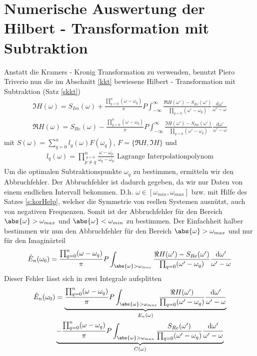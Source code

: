 \section{Numerische Auswertung der Hilbert - Transformation mit Subtraktion}\label{num:skkt}
Anstatt die Kramers - Kronig Transformation zu verwenden, benutzt Piero Triverio \cite{Triverio2006a} nun die im Abschnitt \ref{kkt} bewiesene Hilbert - Transformation mit Subtraktion (Satz \ref{skkt}) 
\begin{align}
	\Im{H(\omega)} = S_{Im}(\omega) + \frac{\prod_{q=0}^{n} (\omega - \omega_q)}{\pi} P \int_{-\infty}^{\infty} \frac{\Re{H(\omega')} - S_{Re}(\omega')}{\prod_{q = 0} (\omega' - \omega_q)} \frac{\mathrm{d\omega'}}{\omega' -\omega}\label{skkt:gl1} \\
\Re{H(\omega)} = S_{Re}(\omega) - \frac{\prod_{q=0}^{n} (\omega - \omega_q)}{\pi} P \int_{-\infty}^{\infty} \frac{\Im{H(\omega')} - S_{Im}(\omega')}{\prod_{q = 0} (\omega' - \omega_q)} \frac{\mathrm{d\omega'}}{\omega' -\omega} \label{skkt:gl2}
\end{align}
mit $S(\omega) = \sum_{q=0}^{n} l_q(\omega) F(\omega_q)$, $F =\{\Re{H}, \Im{H}\} $ und 
\begin{align}
	l_q(\omega) = \prod_{\stackrel{p=0 }{p \neq q}}^n \frac{\omega - \omega_p}{\omega_q - \omega_p} \text{ Lagrange Interpolationpolynom}
\end{align}
Um die optimalen Subtraktionspunkte $\omega_q$ zu bestimmen, ermitteln wir den Abbruchfehler. Der Abbruchfehler ist dadurch gegeben, da wir nur Daten von einem endlichen Intervall bekommen. D.h. $\omega \in [\omega_{min}, \omega_{max}]$ 
bzw. mit Hilfe des Satzes \ref{s:korHelp}, welcher die Symmetrie von reellen Systemen ausnützt, auch von negativen Frequenzen. Somit ist der Abbruchfehler für den Bereich $\abs{\omega} > \omega_{max}$ und $\abs{\omega} < \omega_{min}$ zu bestimmen. Der Einfachheit halber bestimmen wir nun den Abbruchfehler für den Bereich $\abs{\omega} > \omega_{max}$ und nur für den Imaginärteil
\begin{align}
	\hat{E}_n(\omega_0) = \frac{\prod_{q=0}^{n} (\omega - \omega_q)}{\pi} P \int_{\abs{\omega} > \omega_{max}} \frac{\Re{H(\omega')} - S_{Re}(\omega')}{\prod_{q = 0} (\omega' - \omega_q)} \frac{\mathrm{d\omega'}}{\omega' -\omega}
\end{align}
Dieser Fehler lässt sich in zwei Integrale aufsplitten
\begin{align}
	\hat{E}_n(\omega_0) &= \underbrace{\frac{\prod_{q=0}^{n} (\omega - \omega_q)}{\pi} P \int_{\abs{\omega} > \omega_{max}} \frac{\Re{H(\omega')} }{\prod_{q = 0} (\omega' - \omega_q)} \frac{\mathrm{d\omega'}}{\omega' -\omega}}_{E_n(\omega)} \\
	&\underbrace{-\frac{\prod_{q=0}^{n} (\omega - \omega_q)}{\pi} P \int_{\abs{\omega} > \omega_{max}} \frac{S_{Re}(\omega')}{\prod_{q = 0} (\omega' - \omega_q)} \frac{\mathrm{d\omega'}}{\omega' -\omega}}_{C(\omega)}
\end{align}
